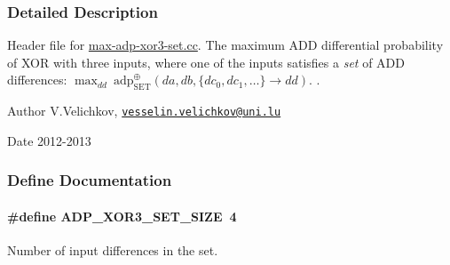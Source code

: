 \subsubsection{\-Detailed \-Description}
\-Header file for \hyperlink{max-adp-xor3-set_8cc}{max-\/adp-\/xor3-\/set.\-cc}. \-The maximum \-A\-D\-D differential probability of \-X\-O\-R with three inputs, where one of the inputs satisfies a {\itshape set\/} of \-A\-D\-D differences\-: $\max_{dd}~\mathrm{adp}^{\oplus}_{\mathrm{SET}}(da, db, \{{dc}_0, {dc}_1, \ldots\} \rightarrow dd)$. . \begin{DoxyAuthor}{\-Author}
\-V.\-Velichkov, \href{mailto:vesselin.velichkov@uni.lu}{\tt vesselin.\-velichkov@uni.\-lu} 
\end{DoxyAuthor}
\begin{DoxyDate}{\-Date}
2012-\/2013 
\end{DoxyDate}


\subsubsection{\-Define \-Documentation}
\hypertarget{max-adp-xor3-set_8hh_a6b52658f2068b1daef8ed31dd70ead0c}{
\paragraph[{\-A\-D\-P\-\_\-\-X\-O\-R3\-\_\-\-S\-E\-T\-\_\-\-S\-I\-Z\-E}]{\setlength{\rightskip}{0pt plus 5cm}\#define {\bf \-A\-D\-P\-\_\-\-X\-O\-R3\-\_\-\-S\-E\-T\-\_\-\-S\-I\-Z\-E}~4}}\label{max-adp-xor3-set_8hh_a6b52658f2068b1daef8ed31dd70ead0c}
\-Number of input differences in the set. 

